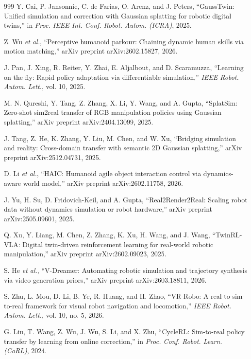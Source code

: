 \documentclass[12pt,a4paper,oneside]{report}
\begin{document}
\begin{thebibliography}{999}
Y. Cai, P. Jansonnie, C. de Farias, O. Arenz, and J. Peters, ``{GaussTwin}: Unified simulation and correction with Gaussian splatting for robotic digital twins,'' in \textit{Proc. IEEE Int. Conf. Robot. Autom. (ICRA)}, 2025.

Z. Wu \textit{et al.}, ``Perceptive humanoid parkour: Chaining dynamic human skills via motion matching,'' arXiv preprint arXiv:2602.15827, 2026.

J. Pan, J. Xing, R. Reiter, Y. Zhai, E. Aljalbout, and D. Scaramuzza, ``Learning on the fly: Rapid policy adaptation via differentiable simulation,'' \textit{IEEE Robot. Autom. Lett.}, vol. 10, 2025.

M. N. Qureshi, Y. Tang, Z. Zhang, X. Li, Y. Wang, and A. Gupta, ``{SplatSim}: Zero-shot sim2real transfer of {RGB} manipulation policies using Gaussian splatting,'' arXiv preprint arXiv:2404.13099, 2025.

J. Tang, Z. He, K. Zhang, Y. Liu, M. Chen, and W. Xu, ``Bridging simulation and reality: Cross-domain transfer with semantic 2D Gaussian splatting,'' arXiv preprint arXiv:2512.04731, 2025.

D. Li \textit{et al.}, ``{HAIC}: Humanoid agile object interaction control via dynamics-aware world model,'' arXiv preprint arXiv:2602.11758, 2026.

J. Yu, H. Su, D. Fridovich-Keil, and A. Gupta, ``{Real2Render2Real}: Scaling robot data without dynamics simulation or robot hardware,'' arXiv preprint arXiv:2505.09601, 2025.

Q. Xu, Y. Liang, M. Chen, Z. Zhang, K. Xu, H. Wang, and J. Wang, ``{TwinRL-VLA}: Digital twin-driven reinforcement learning for real-world robotic manipulation,'' arXiv preprint arXiv:2602.09023, 2025.

S. He \textit{et al.}, ``{V-Dreamer}: Automating robotic simulation and trajectory synthesis via video generation priors,'' arXiv preprint arXiv:2603.18811, 2026.

S. Zhu, L. Mou, D. Li, B. Ye, R. Huang, and H. Zhao, ``{VR-Robo}: A real-to-sim-to-real framework for visual robot navigation and locomotion,'' \textit{IEEE Robot. Autom. Lett.}, vol. 10, no. 5, 2026.

G. Liu, T. Wang, Z. Wu, J. Wu, S. Li, and X. Zhu, ``{CycleRL}: Sim-to-real policy transfer by learning from online correction,'' in \textit{Proc. Conf. Robot. Learn. (CoRL)}, 2024.


\end{thebibliography}
\end{document}
